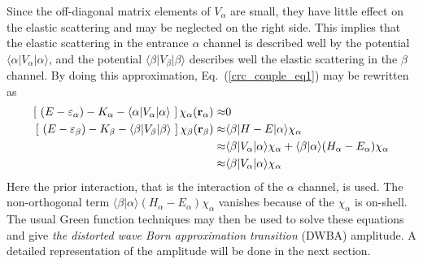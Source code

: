 \documentclass[
12pt, %
oneside, %
english, %
doublespacing, %
doublespacing, %
toctotoc, %
parskip, %
headsepline, %
]{MastersDoctoralThesis} %
\begin{document}
Since the off-diagonal matrix elements of $V_\alpha$ are small, they have little effect on the elastic scattering and may be neglected on the right side. 
This implies that the elastic scattering in the entrance $\alpha$ channel is described well by the potential $\langle \alpha \vert V_\alpha \vert \alpha \rangle$, and the potential $\langle \beta \vert V_\beta \vert \beta \rangle$ describes well the elastic scattering in the $\beta$ channel.
By doing this approximation, Eq.~(\ref{crc_couple_eq1}) may be rewritten as
\begin{align}
\left[ ~\left(E-\varepsilon_\alpha \right)  -K_\alpha -
\langle \alpha \vert V_\alpha \vert \alpha \rangle ~\right] 
\chi_\alpha ({\bf r}_\alpha) \approx & 0
 \nonumber \\
\left[ ~\left(E-\varepsilon_\beta \right)  -K_\beta -
\langle \beta \vert V_\beta \vert \beta \rangle ~\right] 
\chi_\beta ({\bf r}_\beta) \approx &
\langle \beta \vert H-E \vert \alpha \rangle \chi_\alpha
\nonumber \\
\approx &
\langle \beta \vert V_\alpha \vert  \alpha \rangle \chi_\alpha + \langle \beta \vert \alpha \rangle (H_\alpha - E_\alpha) \chi_\alpha 
\nonumber \\
\approx & \langle \beta \vert V_\alpha \vert  \alpha \rangle \chi_\alpha
\label{crc_couple_eq2}
\end{align}
 Here the prior interaction, that is the interaction of the $\alpha$ channel, is used. The non-orthogonal term $\langle \beta \vert \alpha \rangle (H_\alpha - E_\alpha) \chi_\alpha$ vanishes because of the $\chi_\alpha$ is on-shell. The usual Green function techniques may then be used to solve these equations and give \textit{the  distorted wave Born approximation transition} (DWBA) amplitude. A detailed representation of the amplitude will be done in the next section. 
\end{document}
